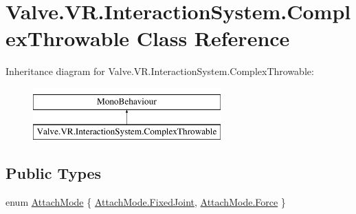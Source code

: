 \hypertarget{class_valve_1_1_v_r_1_1_interaction_system_1_1_complex_throwable}{}\section{Valve.\+V\+R.\+Interaction\+System.\+Complex\+Throwable Class Reference}
\label{class_valve_1_1_v_r_1_1_interaction_system_1_1_complex_throwable}
Inheritance diagram for Valve.\+V\+R.\+Interaction\+System.\+Complex\+Throwable\+:\begin{figure}[H]
\begin{center}
\leavevmode
\includegraphics[height=2.000000cm]{class_valve_1_1_v_r_1_1_interaction_system_1_1_complex_throwable}
\end{center}
\end{figure}
\subsection*{Public Types}
\begin{DoxyCompactItemize}
\item 
enum \mbox{\hyperlink{class_valve_1_1_v_r_1_1_interaction_system_1_1_complex_throwable_a3767479e716ee64bf8f7b2d5d46c67b7}{Attach\+Mode}} \{ \mbox{\hyperlink{class_valve_1_1_v_r_1_1_interaction_system_1_1_complex_throwable_a3767479e716ee64bf8f7b2d5d46c67b7a745602638f184063907e534fc67cf1f8}{Attach\+Mode.\+Fixed\+Joint}}, 
\mbox{\hyperlink{class_valve_1_1_v_r_1_1_interaction_system_1_1_complex_throwable_a3767479e716ee64bf8f7b2d5d46c67b7a9eb6b78a99cdb6ffd3d40d18621d9f80}{Attach\+Mode.\+Force}}
 \}
\end{DoxyCompactItemize}
